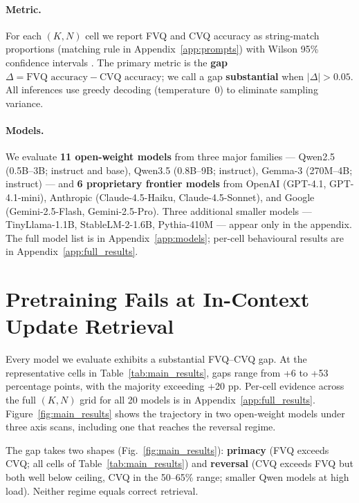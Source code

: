 \documentclass[11pt]{article}
\begin{document}
\paragraph{Metric.}
For each $(K, N)$ cell we report FVQ and CVQ accuracy as
string-match proportions (matching rule in
Appendix~\ref{app:prompts}) with Wilson 95\% confidence intervals
\citep{wilson1927}.
The primary metric is the \textbf{gap}
$\Delta = \text{FVQ accuracy} - \text{CVQ accuracy}$; we call a gap
\textbf{substantial} when $|\Delta| > 0.05$.
All inferences use greedy decoding (temperature~0) to eliminate
sampling variance.

\paragraph{Models.}
We evaluate \textbf{11 open-weight models} from three major
families --- Qwen2.5 (0.5B--3B; instruct and base), Qwen3.5
(0.8B--9B; instruct), Gemma-3 (270M--4B; instruct) --- and \textbf{6
proprietary frontier models} from OpenAI (GPT-4.1, GPT-4.1-mini),
Anthropic (Claude-4.5-Haiku, Claude-4.5-Sonnet), and Google
(Gemini-2.5-Flash, Gemini-2.5-Pro).
Three additional smaller models --- TinyLlama-1.1B, StableLM-2-1.6B,
Pythia-410M --- appear only in the appendix.
The full model list is in Appendix~\ref{app:models}; per-cell
behavioural results are in Appendix~\ref{app:full_results}.

\section{Pretraining Fails at In-Context Update Retrieval}
\label{sec:failure}

Every model we evaluate exhibits a substantial FVQ--CVQ gap.
At the representative cells in Table~\ref{tab:main_results}, gaps
range from +6 to +53 percentage points, with the majority exceeding
+20 pp.
Per-cell evidence across the full $(K, N)$ grid for all 20 models is
in Appendix~\ref{app:full_results}.
Figure~\ref{fig:main_results} shows the trajectory in two open-weight
models under three axis scans, including one that reaches the
reversal regime.

The gap takes two shapes (Fig.~\ref{fig:main_results}):
\textbf{primacy} (FVQ exceeds CVQ; all cells of
Table~\ref{tab:main_results}) and \textbf{reversal} (CVQ exceeds FVQ
but both well below ceiling, CVQ in the 50--65\% range; smaller
Qwen models at high load). Neither regime equals correct retrieval.
\end{document}
